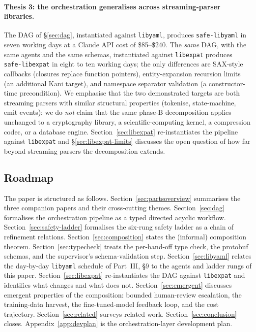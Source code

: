 \documentclass[12pt]{article}
\theoremstyle{definition}
\theoremstyle{remark}
\newcommand{\libyaml}{\texttt{libyaml}}
\newcommand{\safelibyaml}{\texttt{safe-libyaml}}
\newcommand{\libexpat}{\texttt{libexpat}}
\newcommand{\safelibexpat}{\texttt{safe-libexpat}}
\begin{document}
\paragraph{Thesis 3: the orchestration generalises across
streaming-parser libraries.} The DAG of \S{}\ref{sec:dag},
instantiated against \libyaml{}, produces \safelibyaml{} in seven
working days at a Claude API cost of \$85--\$240. The \emph{same}
DAG, with the same agents and the same schemas, instantiated against
\libexpat{} produces \safelibexpat{} in eight to ten working days; the
only differences are SAX-style callbacks (closures replace function
pointers), entity-expansion recursion limits (an additional Kani
target), and namespace separator validation (a constructor-time
precondition). We emphasise that the two demonstrated targets are
both streaming parsers with similar structural properties (tokenise,
state-machine, emit events); we do \emph{not} claim that the same
phase-B decomposition applies unchanged to a cryptography library, a
scientific-computing kernel, a compression codec, or a database
engine. Section~\ref{sec:libexpat} re-instantiates the pipeline
against \libexpat{} and \S{}\ref{sec:libexpat-limits} discusses the
open question of how far beyond streaming parsers the decomposition
extends.

\subsection{Roadmap}
\label{sec:roadmap}

The paper is structured as follows.
Section~\ref{sec:partsoverview} summarises the three companion papers
and their cross-cutting themes.
Section~\ref{sec:dag} formalises the orchestration pipeline as a typed
directed acyclic workflow.
Section~\ref{sec:safety-ladder} formalises the six-rung safety ladder
as a chain of refinement relations.
Section~\ref{sec:composition} states the (informal) composition
theorem.
Section~\ref{sec:typecheck} treats the per-hand-off type check, the
protobuf schemas, and the supervisor's schema-validation step.
Section~\ref{sec:libyaml} relates the day-by-day \libyaml{} schedule of
Part~III, \S{}9 to the agents and ladder rungs of this paper.
Section~\ref{sec:libexpat} re-instantiates the DAG against \libexpat{}
and identifies what changes and what does not.
Section~\ref{sec:emergent} discusses emergent properties of the
composition: bounded human-review escalation, the training-data harvest,
the fine-tuned-model feedback loop, and the cost trajectory.
Section~\ref{sec:related} surveys related work.
Section~\ref{sec:conclusion} closes.
Appendix~\ref{app:devplan} is the orchestration-layer development plan.
\end{document}
